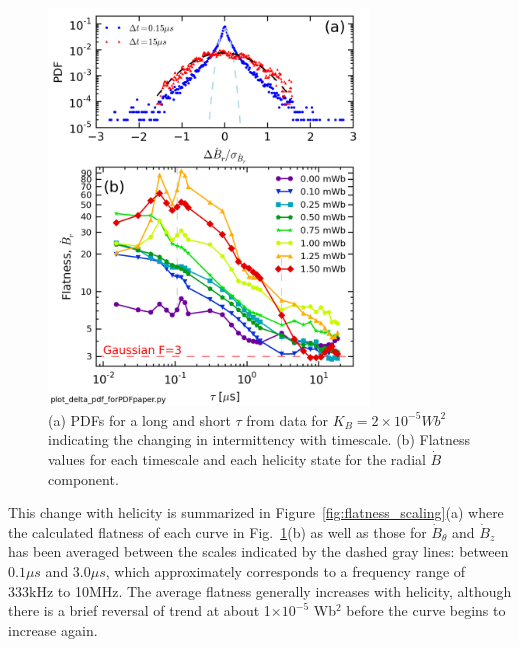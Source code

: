 \documentclass[aip,prl,amsmath,amssymb,reprint,superscriptaddress]{revtex4-1} %
\begin{document}
\begin{figure}[!htbp]
\centerline{
\includegraphics[width=8.5cm]{Br_flatness.png}}
\caption{\label{fig:Br_flatness} (a) PDFs for a long and short $\tau$ from data for $K_{B} = 2\times 10^{-5} Wb^{2}$ indicating the changing in intermittency with timescale. (b) Flatness values for each timescale and each helicity state for the radial $\dot{B}$ component.}
\end{figure}

This change with helicity is summarized in Figure~\ref{fig:flatness_scaling}(a) where the calculated flatness of each curve in Fig.~\ref{fig:Br_flatness}(b) as well as those for $\dot{B}_{\theta}$ and $\dot{B}_{z}$ has been averaged between the scales indicated by the dashed gray lines: between $0.1\mu s$ and $3.0\mu s$, which approximately corresponds to a frequency range of 333kHz to 10MHz. The average flatness generally increases with helicity, although there is a brief reversal of trend at about 1$\times 10^{-5}$ Wb$^{2}$ before the curve begins to increase again.
\end{document}

